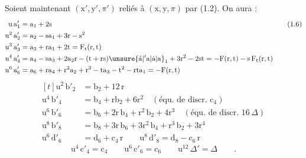 Soient maintenant $(\mathrm{x}',\mathrm{y}',\pi')$ reliés à $(\mathrm{x},\mathrm{y},\pi)$ par (1.2). On aura :
\[
\begin{aligned}[t]
\mathrm{u}\,\mathrm{a}'_{1}&=\mathrm{a}_{1}+2\mathrm{s}\\
\mathrm{u}^{2}\,\mathrm{a}'_{2}&=\mathrm{a}_{2}-\mathrm{sa}_{1}+3\mathrm{r}-\mathrm{s}^{2}\\
\mathrm{u}^{3}\,\mathrm{a}'_{3}&=\mathrm{a}_{3}+\mathrm{ra}_{1}+2\mathrm{t}=\mathrm{F}_{\mathrm{t}}(\mathrm{r},\mathrm{t})\\
\mathrm{u}^{4}\,\mathrm{a}'_{4}&=\mathrm{a}_{4}-\mathrm{sa}_{3}+2\mathrm{a}_{2}\mathrm{r}-(\mathrm{t}+\mathrm{rs})\unsure{\acute{\mathrm{a}}|{}'\mathrm{a}|\dot{\mathrm{a}}|\mathrm{a}}_{1}+3\mathrm{r}^{2}-2\mathrm{st}
=-\mathrm{F}(\mathrm{r},\mathrm{t})-\mathrm{s}\,\mathrm{F}_{\mathrm{t}}(\mathrm{r},\mathrm{t})\\
\mathrm{u}^{6}\,\mathrm{a}'_{6}&=\mathrm{a}_{6}+\mathrm{ra}_{4}+\mathrm{r}^{2}\mathrm{a}_{2}+\mathrm{r}^{3}-\mathrm{ta}_{3}-\mathrm{t}^{2}-\mathrm{rta}_{1}=-\mathrm{F}(\mathrm{r},\mathrm{t})
\end{aligned}
\tag*{(1.6)}
\]
\[
\begin{aligned}[t]
\mathrm{u}^{2}\,\mathrm{b}'_{2}&=\mathrm{b}_{2}+12\,\mathrm{r}\\
\mathrm{u}^{4}\,\mathrm{b}'_{4}&=\mathrm{b}_{4}+\mathrm{rb}_{2}+6\mathrm{r}^{2}\quad(\text{équ. de discr. }\mathrm{c}_{4})\\
\mathrm{u}^{6}\,\mathrm{b}'_{6}&=\mathrm{b}_{6}+2\mathrm{r}\,\mathrm{b}_{4}+\mathrm{r}^{2}\,\mathrm{b}_{2}+4\mathrm{r}^{3}\quad(\text{équ. de discr. }16\,\Delta)\\
\mathrm{u}^{8}\,\mathrm{b}'_{8}&=\mathrm{b}_{8}+3\mathrm{r}\,\mathrm{b}_{6}+3\mathrm{r}^{2}\,\mathrm{b}_{4}+\mathrm{r}^{3}\,\mathrm{b}_{2}+3\mathrm{r}^{4}\\
\mathrm{u}^{6}\,\mathrm{d}'_{6}&=\mathrm{d}_{6}+\mathrm{c}_{4}\,\mathrm{r}\qquad\mathrm{u}^{8}\,\mathrm{d}'_{8}=\mathrm{d}_{8}-\mathrm{c}_{6}\,\mathrm{r}
\end{aligned}
\tag*{(1.7)}
\]
\clearpage
\[
\mathrm{u}^{4}\,\mathrm{c}'_{4}=\mathrm{c}_{4}\qquad
\mathrm{u}^{6}\,\mathrm{c}'_{6}=\mathrm{c}_{6}\qquad
\mathrm{u}^{12}\,\Delta'=\Delta\qquad.
\tag*{(1.8)}
\]

